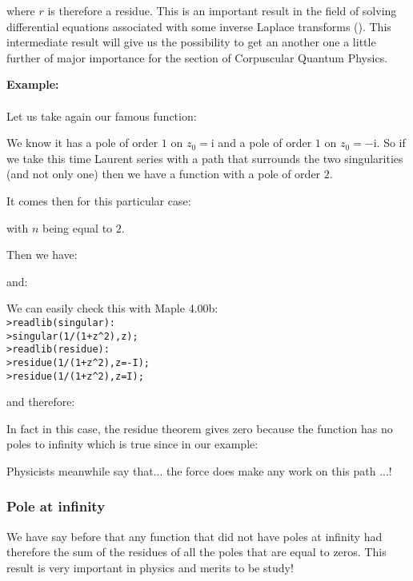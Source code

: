 	where $r$ is therefore a residue. This is an important result in the field of solving differential equations associated with some inverse Laplace transforms (). This intermediate result will give us the possibility to get an another one a little further of major importance for the section of Corpuscular Quantum Physics.
	\begin{tcolorbox}[colframe=black,colback=white,sharp corners]
	\textbf{{\Large {}}Example:}\\\\
	Let us take again our famous function:
	
	We know it has a pole of order $1$ on $z_0=\mathrm{i}$ and a pole of order $1$ on $z_0=-\mathrm{i}$. So if we take this time Laurent series with a path that surrounds the two singularities (and not only one) then we have a function with a pole of order $2$.
	
	It comes then for this particular case:
	
	with $n$ being equal to $2$.
	
	Then we have:
	
	and:
	
	\end{tcolorbox}
	
	\pagebreak
	\begin{tcolorbox}[colframe=black,colback=white,sharp corners]
	We can easily check this with Maple 4.00b:\\
	
	\texttt{>readlib(singular):\\
	>singular(1/(1+z\string^2),z);\\
	>readlib(residue):\\
	>residue(1/(1+z\string^2),z=-I);\\
	>residue(1/(1+z\string^2),z=I);\\}

	and therefore:
	
	In fact in this case, the residue theorem gives zero because the function has no poles to infinity which is true since in our example:
	
	Physicists meanwhile say that... the force does make any work on this path ...!
	\end{tcolorbox}
	
	\subsubsection{Pole at infinity}
	We have say before that any function that did not have poles at infinity had therefore the sum of the residues of all the poles that are equal to zeros. This result is very important in physics and merits to be study!
	
